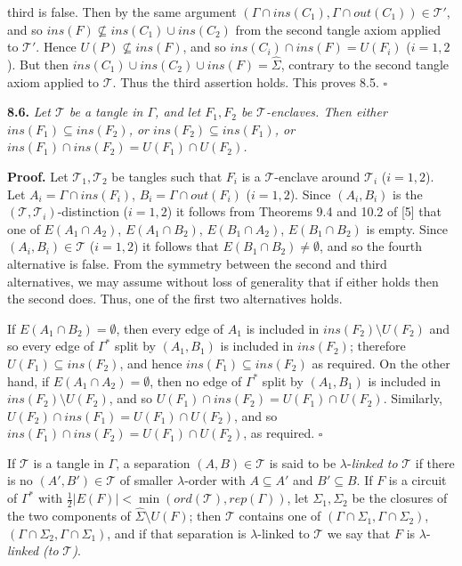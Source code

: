 \noindent third is false. Then by the same argument $(\Gamma \cap ins(C_1), \Gamma \cap out(C_1)) \in \mathscr{T}'$, and so $ins(F) \nsubseteq ins(C_1) \cup ins(C_2)$ from the second tangle axiom applied to $\mathscr{T}'$. Hence $U(P) \nsubseteq ins(F)$, and so $ins(C_i) \cap ins(F) = U(F_i)$ ($i = 1,2$). But then $ins(C_1) \cup ins(C_2) \cup ins(F) = \hat{\Sigma}$, contrary to the second tangle axiom applied to $\mathscr{T}$. Thus the third assertion holds. This proves 8.5. $\square$

\textbf{8.6.} \textit{Let $\mathscr{T}$ be a tangle in $\Gamma$, and let $F_1, F_2$ be $\mathscr{T}$-enclaves. Then either $ins(F_1) \subseteq ins(F_2)$, or $ins(F_2) \subseteq ins(F_1)$, or $ins(F_1) \cap ins(F_2) = U(F_1) \cap U(F_2)$.}

\textbf{Proof.} Let $\mathscr{T}_1, \mathscr{T}_2$ be tangles such that $F_i$ is a $\mathscr{T}$-enclave around $\mathscr{T}_i$ ($i = 1,2$). Let $A_i = \Gamma \cap ins(F_i)$, $B_i = \Gamma \cap out(F_i)$ ($i = 1,2$). Since $(A_i, B_i)$ is the $(\mathscr{T}, \mathscr{T}_i)$-distinction ($i = 1,2$) it follows from Theorems 9.4 and 10.2 of [5] that one of $E(A_1 \cap A_2)$, $E(A_1 \cap B_2)$, $E(B_1 \cap A_2)$, $E(B_1 \cap B_2)$ is empty. Since $(A_i, B_i) \in \mathscr{T}$ ($i = 1,2$) it follows that $E(B_1 \cap B_2) \ne \emptyset$, and so the fourth alternative is false. From the symmetry between the second and third alternatives, we may assume without loss of generality that if either holds then the second does. Thus, one of the first two alternatives holds.

If $E(A_1 \cap B_2) = \emptyset$, then every edge of $A_1$ is included in $ins(F_2) \setminus U(F_2)$ and so every edge of $\Gamma^*$ split by $(A_1, B_1)$ is included in $ins(F_2)$; therefore $U(F_1) \subseteq ins(F_2)$, and hence $ins(F_1) \subseteq ins(F_2)$ as required. On the other hand, if $E(A_1 \cap A_2) = \emptyset$, then no edge of $\Gamma^*$ split by $(A_1, B_1)$ is included in $ins(F_2) \setminus U(F_2)$, and so $U(F_1) \cap ins(F_2) = U(F_1) \cap U(F_2)$. Similarly, $U(F_2) \cap ins(F_1) = U(F_1) \cap U(F_2)$, and so $ins(F_1) \cap ins(F_2) = U(F_1) \cap U(F_2)$, as required. $\square$

If $\mathscr{T}$ is a tangle in $\Gamma$, a separation $(A, B) \in \mathscr{T}$ is said to be $\lambda$-\textit{linked to} $\mathscr{T}$ if there is no $(A', B') \in \mathscr{T}$ of smaller $\lambda$-order with $A \subseteq A'$ and $B' \subseteq B$. If $F$ is a circuit of $\Gamma^*$ with $\frac{1}{2} |E(F)| < \min(ord(\mathscr{T}), rep(\Gamma))$, let $\Sigma_1, \Sigma_2$ be the closures of the two components of $\hat{\Sigma} \setminus U(F)$; then $\mathscr{T}$ contains one of $(\Gamma \cap \Sigma_1, \Gamma \cap \Sigma_2)$, $(\Gamma \cap \Sigma_2, \Gamma \cap \Sigma_1)$, and if that separation is $\lambda$-linked to $\mathscr{T}$ we say that $F$ is $\lambda$-\textit{linked (to} $\mathscr{T}$\textit{)}.

